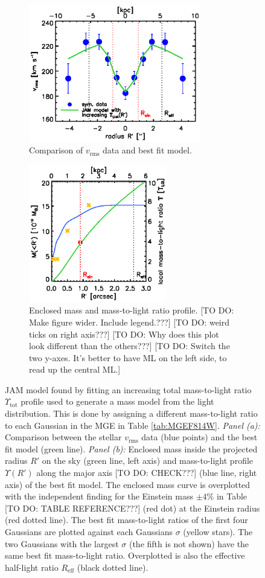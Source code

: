 
\begin{figure}
\centering
\begin{subfigure}{.5\textwidth}
  \centering
  \includegraphics[height=6cm]{fig/jam_G_vrms.ps}
  \caption{Comparison of $v_\text{rms}$ data and best fit model.}
  \label{fig:JAM_modelG}
\end{subfigure}%
\begin{subfigure}{.5\textwidth}
  \centering
  \includegraphics[height=6cm]{fig/jam_G_enclMass.ps}
  \caption{Enclosed mass and mass-to-light ratio profile. [TO DO: Make figure wider. Include legend.???] [TO DO: weird  ticks on right axis???] [TO DO: Why does this plot look different than the others???] [TO DO: Switch the two y-axes. It's better to have ML on the left side, to read up the central ML.]}
  \label{fig:enclMass_modelG}
\end{subfigure}
\caption{JAM model found by fitting an increasing total mass-to-light ratio $\Upsilon_\text{tot}$ profile used to generate a mass model from the light distribution.  This is done by assigning a different mass-to-light ratio to each Gaussian in the MGE in Table \ref{tab:MGEF814W}. \emph{Panel (a):} Comparison between the stellar $v_\text{rms}$ data (blue points) and the best fit model (green line). \emph{Panel (b):} Enclosed mass inside the projected radius $R'$ on the sky (green line, left axis) and mass-to-light profile $\Upsilon(R')$ along the major axis [TO DO: CHECK???] (blue line, right axis) of the best fit model. The enclosed mass curve is overplotted with the independent finding for the Einstein mass $\pm 4 \%$ in Table [TO DO: TABLE REFERENCE???] (red dot) at the Einstein radius (red dotted line). The best fit mass-to-light ratios of the first four Gaussians are plotted against each Gaussians $\sigma$ (yellow stars). The two Gaussians with the largest $\sigma$ (the fifth is not shown) have the same best fit mass-to-light ratio. Overplotted is also the effective half-light ratio $R_\text{eff}$ (black dotted line).}
\label{fig:modelG}
\end{figure}

